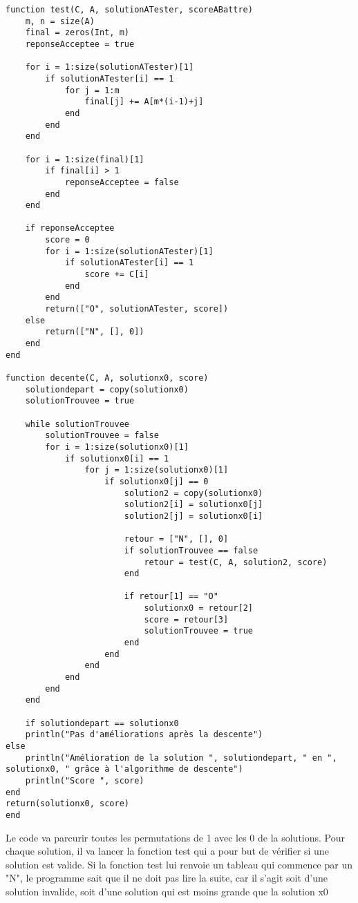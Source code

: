 \begin{lstlisting}
function test(C, A, solutionATester, scoreABattre)
    m, n = size(A)
    final = zeros(Int, m)
    reponseAcceptee = true

    for i = 1:size(solutionATester)[1]
        if solutionATester[i] == 1
            for j = 1:m
                final[j] += A[m*(i-1)+j]
            end
        end
    end

    for i = 1:size(final)[1]
        if final[i] > 1
            reponseAcceptee = false
        end
    end

    if reponseAcceptee
        score = 0
        for i = 1:size(solutionATester)[1]
            if solutionATester[i] == 1
                score += C[i]
            end
        end
        return(["O", solutionATester, score])
    else
        return(["N", [], 0])
    end
end

function decente(C, A, solutionx0, score)
    solutiondepart = copy(solutionx0)
    solutionTrouvee = true

    while solutionTrouvee
        solutionTrouvee = false
        for i = 1:size(solutionx0)[1]
            if solutionx0[i] == 1
                for j = 1:size(solutionx0)[1]
                    if solutionx0[j] == 0
                        solution2 = copy(solutionx0)
                        solution2[i] = solutionx0[j]
                        solution2[j] = solutionx0[i]

                        retour = ["N", [], 0]
                        if solutionTrouvee == false
                            retour = test(C, A, solution2, score)
                        end

                        if retour[1] == "O"
                            solutionx0 = retour[2]
                            score = retour[3]
                            solutionTrouvee = true
                        end
                    end
                end
            end
        end
    end

    if solutiondepart == solutionx0
    println("Pas d'améliorations après la descente")
else
    println("Amélioration de la solution ", solutiondepart, " en ", solutionx0, " grâce à l'algorithme de descente")
    println("Score ", score)
end
return(solutionx0, score)
end

\end{lstlisting}

\vspace{5mm}
\noindent
Le code va parcurir toutes les permutations de 1 avec les 0 de la solutions. Pour chaque solution, il va lancer la fonction test qui a pour but de vérifier si une solution est valide. Si la fonction test lui renvoie un tableau qui commence par un "N", le programme sait que il ne doit pas lire la suite, car il s'agit soit d'une solution invalide, soit d'une solution qui est moins grande que la solution x0

